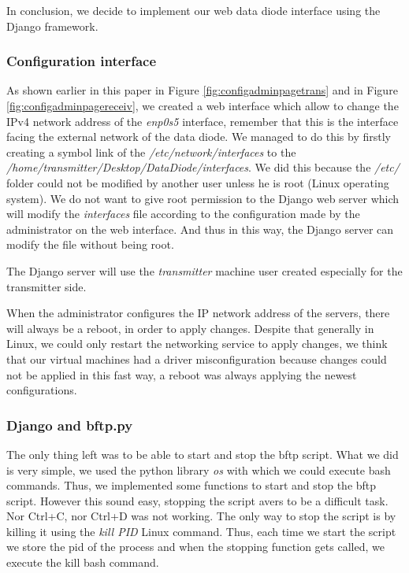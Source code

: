 \documentclass[a4paper,10pt]{article}
\begin{document}
In conclusion, we decide to implement our web data diode interface using the Django framework.

\subsubsection{Configuration interface}
As shown earlier in this paper in Figure \ref{fig:configadminpagetrans} and in Figure \ref{fig:configadminpagereceiv}, we created a web interface which allow to change the IPv4 network address of the \emph{enp0s5} interface, remember that this is the interface facing the external network of the data diode. We managed to do this by firstly creating a symbol link of the \emph{/etc/network/interfaces} to the \emph{/home/transmitter/Desktop/DataDiode/interfaces}. We did this because the \emph{/etc/} folder could not be modified by another user unless he is root (Linux operating system). We do not want to give root permission to the Django web server which will modify the \emph{interfaces} file according to the configuration made by the administrator on the web interface. And thus in this way, the Django server can modify the file without being root.

The Django server will use the \emph{transmitter} machine user created especially for the transmitter side.

When the administrator configures the IP network address of the servers, there will always be a reboot, in order to apply changes. Despite that generally in Linux, we could only restart the networking service to apply changes, we think that our virtual machines had a driver misconfiguration because changes could not be applied in this fast way, a reboot was always applying the newest configurations.

\subsubsection{Django and bftp.py}
The only thing left was to be able to start and stop the bftp script. What we did is very simple, we used the python library \emph{os} with which we could execute bash commands. Thus, we implemented some functions to start and stop the bftp script. However this sound easy, stopping the script avers to be a difficult task. Nor Ctrl+C, nor Ctrl+D was not working. The only way to stop the script is by killing it using the \emph{kill PID} Linux command. Thus, each time we start the script we store the pid of the process and when the stopping function gets called, we execute the kill bash command.
\end{document}
